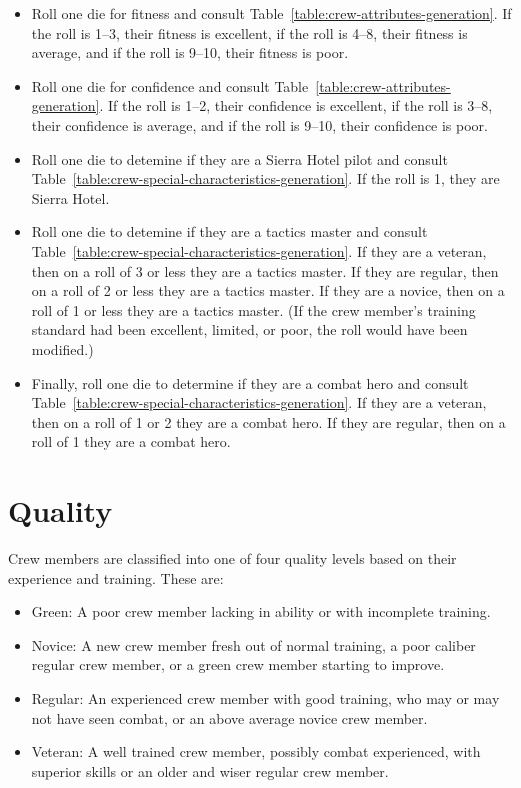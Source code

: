 \begin{advancedrules}
{\begin{itemize}
\item Roll one die for fitness and consult Table~\ref{table:crew-attributes-generation}. If the roll is 1--3, their fitness is excellent, if the roll is 4--8, their fitness is average, and if the roll is 9--10, their fitness is poor. 

\item Roll one die for confidence and consult Table~\ref{table:crew-attributes-generation}. If the  roll is 1--2, their confidence is excellent, if the roll is 3--8, their confidence is average, and if the roll is 9--10, their confidence is poor. 

\item Roll one die to detemine if they are a Sierra Hotel pilot and consult Table~\ref{table:crew-special-characteristics-generation}. If the roll is 1, they are Sierra Hotel. 

\item Roll one die to detemine if they are a tactics master and consult Table~\ref{table:crew-special-characteristics-generation}. If they are a veteran, then on a roll of 3 or less they are a tactics master. If they are regular, then on a roll of 2 or less they are a tactics master. If they are a novice, then on a roll of 1 or less they are a tactics master. (If the crew member's training standard had been excellent, limited, or poor, the roll would have been modified.)

\item Finally, roll one die to determine if they are a combat hero and consult Table~\ref{table:crew-special-characteristics-generation}.  If they are a veteran, then on a roll of 1 or 2 they are a combat hero. If they are regular, then on a roll of 1 they are a combat hero.
\end{itemize}

\section{Quality}
\label{rule:crew-quality}

Crew members are classified into one of four quality levels based on their experience and training. These are:

\begin{itemize}
    \item Green: A poor crew member lacking in ability or with incomplete training.
    \item Novice: A new crew member fresh out of normal training, a poor caliber regular crew member, or a green crew member starting to improve.
    \item Regular: An experienced crew member with good training, who may or may not have seen combat, or an above average novice crew member.
    \item Veteran: A well trained crew member, possibly combat experienced, with superior skills or an older and wiser regular crew member.
\end{itemize}

}
\end{advancedrules}
